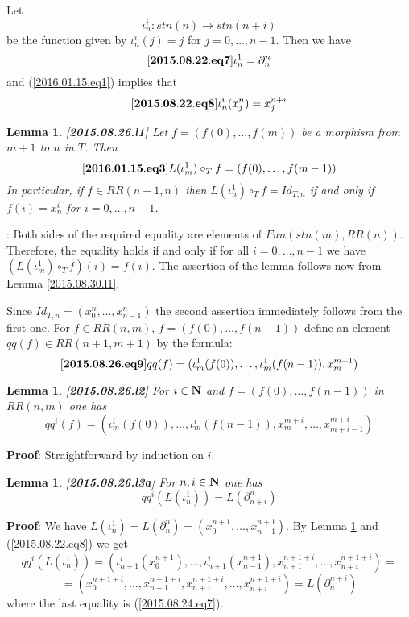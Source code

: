 \documentclass[11pt]{article}
\newenvironment{eq}{\begin{equation}}{\end{equation}}
\newenvironment{proof}{{\bf Proof}:}{\vskip 5mm }
\newtheorem{lemma}[proposition]{Lemma}
\newcommand{\llabel}[1]{\label{#1}[{\bf #1}]}
\newcommand{\sr}{\rightarrow}
\newcommand{\nn}{{\bf N\rm}}
\newcommand{\nat}{\nn}
\newcommand{\hc}{\circ_{T}}
\begin{document}
Let 
%
$${\iota}_n^{i}:stn(n)\sr stn(n+i)$$
%
be the function given by ${\iota}_n^i(j)=j$ for $j=0,\dots,n-1$. Then we have
%
\begin{eq}
\llabel{2015.08.22.eq7}
{\iota}_n^{1}=\partial_{n}^{n}
\end{eq}
%
and (\ref{2016.01.15.eq1}) implies that 
%
\begin{eq}
\llabel{2015.08.22.eq8}
{\iota}_n^i(x^n_j)=x^{n+i}_j
\end{eq}
%
\begin{lemma}
\llabel{2015.08.26.l1}
Let $f=(f(0),\dots,f(m))$ be a morphism from $m+1$ to $n$ in $T$. Then
%
\begin{eq}\llabel{2016.01.15.eq3}
L(\iota_m^1)\hc f=(f(0),\dots,f(m-1))
\end{eq}
%
In particular, if $f\in RR(n+1,n)$ then $L(\iota_n^1)\hc f=Id_{T,n}$ if and only if $f(i)=x_n^i$ for $i=0,\dots,n-1$. 
\end{lemma}
%
\begin{proof}
Both sides of the required equality are elements of $Fun(stn(m),RR(n))$. Therefore, the equality holds if and only if for all $i=0,\dots,n-1$ we have
$(L(\iota_m^1)\hc f)(i)=f(i)$. The assertion of the lemma follows now from Lemma \ref{2015.08.30.l1}.

Since $Id_{T,n}=(x_0^n,\dots,x_{n-1}^n)$ the second assertion immediately follows from the first one.
\end{proof}
%
For $f\in RR(n,m)$, $f=(f(0),\dots,f(n-1))$ define an element $qq(f)\in RR(n+1,m+1)$ by the formula: 
%
\begin{eq}\llabel{2015.08.26.eq9}
qq(f)=(\iota_m^1(f(0)),\dots,\iota_m^1(f(n-1)),x_m^{m+1})
\end{eq}
%
\begin{lemma}
\llabel{2015.08.26.l2}
For $i\in\nat$ and $f=(f(0),\dots,f(n-1))$ in $RR(n,m)$ one has
%
$$qq^i(f)=(\iota_m^i(f(0)),\dots,\iota_m^i(f(n-1)),x_m^{m+i},\dots,x_{m+i-1}^{m+i})$$
%
\end{lemma}
%
\begin{proof}
Straightforward by induction on $i$.
\end{proof}
%
\begin{lemma}
\llabel{2015.08.26.l3a}
For $n,i\in\nat$ one has
%
$$qq^i(L(\iota_n^1))=L(\partial^n_{n+i})$$
%
\end{lemma}
%
\begin{proof}
We have ${L}(\iota_n^1)=L(\partial_n^n)=(x_0^{n+1},\dots,x^{n+1}_{n-1})$. By Lemma \ref{2015.08.26.l2} and (\ref{2015.08.22.eq8}) we get
%
$$qq^i({L}(\iota_n^1))=(\iota_{n+1}^i(x_0^{n+1}),\dots,\iota_{n+1}^i(x_{n-1}^{n+1}),x_{n+1}^{n+1+i},\dots,x_{n+i}^{n+1+i})=$$
$$=(x_0^{n+1+i},\dots,x_{n-1}^{n+1+i},x_{n+1}^{n+1+i},\dots,x_{n+i}^{n+1+i})={L}(\partial_n^{n+i})$$
%
where the last equality is (\ref{2015.08.24.eq7}). 
\end{proof}
\end{document}
